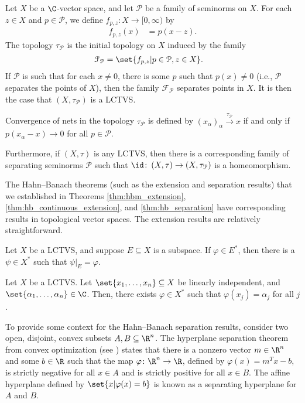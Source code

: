 \begin{proposition}\label{prop:structure_of_lctvs}
  Let $X$ be a $\C$-vector space, and let $\mathcal{P}$ be a family of seminorms on $X$. For each $z\in X$ and $p\in \mathcal{P}$, we define $f_{p,z}\colon X\rightarrow [0,\infty)$ by
  \begin{align*}
    f_{p,z}(x) &= p\left(x-z\right).
  \end{align*}
  The topology $\tau_{\mathcal{P}}$ is the initial topology on $X$ induced by the family
  \begin{align*}
    \mathcal{F}_{\mathcal{P}} &= \set{f_{p,z} | p\in \mathcal{P},z\in X}.
  \end{align*}
  If $\mathcal{P}$ is such that for each $x\neq 0$, there is some $p$ such that $p(x)\neq 0$ (i.e., $\mathcal{P}$ separates the points of $X$), then the family $\mathcal{F}_{\mathcal{P}}$ separates points in $X$. It is then the case that $\left(X,\tau_{\mathcal{P}}\right)$ is a LCTVS.\newline

  Convergence of nets in the topology $\tau_{\mathcal{P}}$ is defined by $\left(x_{\alpha}\right)_{\alpha}\xrightarrow{\tau_{\mathcal{P}}}x$ if and only if $p\left(x_{\alpha}-x\right)\rightarrow 0$ for all $p\in \mathcal{P}$.\newline

  Furthermore, if $\left(X,\tau\right)$ is any LCTVS, then there is a corresponding family of separating seminorms $\mathcal{P}$ such that $\id\colon\left(X,\tau\right)\rightarrow \left(X,\tau_{\mathcal{P}}\right)$ is a homeomorphism.
\end{proposition}
The Hahn--Banach theorems (such as the extension and separation results) that we established in Theorems \ref{thm:hbm_extension}, \ref{thm:hb_continuous_extension}, and \ref{thm:hb_separation} have corresponding results in topological vector spaces. The extension results are relatively straightforward.
\begin{theorem}\label{thm:hb_continuous_extension_lctvs}
  Let $X$ be a LCTVS, and suppose $E\subseteq X$ is a subspace. If $\varphi\in E^{\ast}$, then there is a $\psi\in X^{\ast}$ such that $\psi|_{E} = \varphi$.
\end{theorem}
\begin{corollary}
  Let $X$ be a LCTVS. Let $\set{x_1,\dots,x_n}\subseteq X$ be linearly independent, and $\set{\alpha_1,\dots,\alpha_n}\in \C$. Then, there exists $\varphi\in X^{\ast}$ such that $\varphi\left(x_j\right) = \alpha_j$ for all $j$.
\end{corollary}
To provide some context for the Hahn--Banach separation results, consider two open, disjoint, convex subsets $A,B\subseteq \R^n$. The hyperplane separation theorem from convex optimization (see \cite[Chapter 2.6]{convex_optimization}) states that there is a nonzero vector $m\in \R^n$ and some $b\in \R$ such that the map $\varphi\colon \R^n\rightarrow \R$, defined by $\varphi(x) = m^{T}x - b$, is strictly negative for all $x\in A$ and is strictly positive for all $x\in B$. The affine hyperplane defined by $\set{x | \varphi(x) = b}$ is known as a separating hyperplane for $A$ and $B$.\newline

